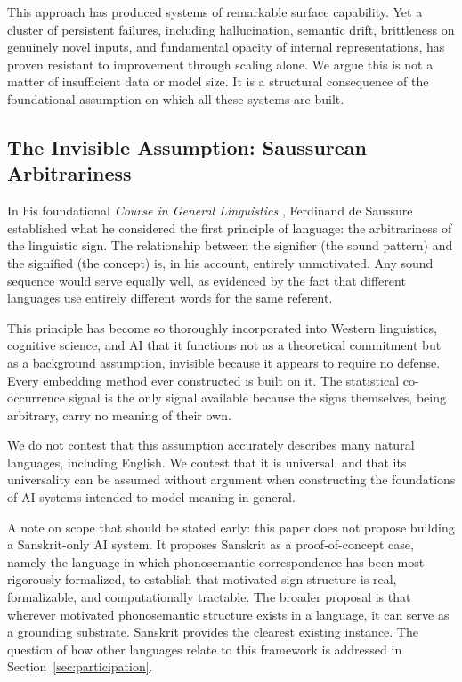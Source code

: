 \documentclass[12pt]{article}
\begin{document}
This approach has produced systems of remarkable surface capability. Yet a cluster of persistent failures, including hallucination, semantic drift, brittleness on genuinely novel inputs, and fundamental opacity of internal representations, has proven resistant to improvement through scaling alone. We argue this is not a matter of insufficient data or model size. It is a structural consequence of the foundational assumption on which all these systems are built.

\subsection{The Invisible Assumption: Saussurean Arbitrariness}

In his foundational \textit{Course in General Linguistics} \cite{saussure1916}, Ferdinand de Saussure established what he considered the first principle of language: the arbitrariness of the linguistic sign. The relationship between the signifier (the sound pattern) and the signified (the concept) is, in his account, entirely unmotivated. Any sound sequence would serve equally well, as evidenced by the fact that different languages use entirely different words for the same referent.

This principle has become so thoroughly incorporated into Western linguistics, cognitive science, and AI that it functions not as a theoretical commitment but as a background assumption, invisible because it appears to require no defense. Every embedding method ever constructed is built on it. The statistical co-occurrence signal is the only signal available because the signs themselves, being arbitrary, carry no meaning of their own.

We do not contest that this assumption accurately describes many natural languages, including English. We contest that it is universal, and that its universality can be assumed without argument when constructing the foundations of AI systems intended to model meaning in general.

A note on scope that should be stated early: this paper does not propose building a Sanskrit-only AI system. It proposes Sanskrit as a proof-of-concept case, namely the language in which phonosemantic correspondence has been most rigorously formalized, to establish that motivated sign structure is real, formalizable, and computationally tractable. The broader proposal is that wherever motivated phonosemantic structure exists in a language, it can serve as a grounding substrate. Sanskrit provides the clearest existing instance. The question of how other languages relate to this framework is addressed in Section~\ref{sec:participation}.
\end{document}

